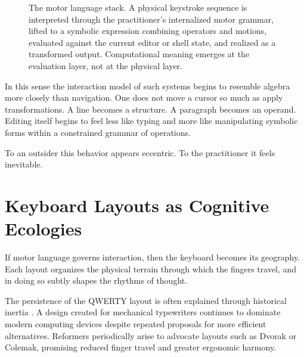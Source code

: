 \documentclass[12pt]{article}
\theoremstyle{definition}
\begin{document}
\begin{figure}[h]
\centering
{}
\caption{The motor language stack. A physical keystroke sequence is
interpreted through the practitioner's internalized motor grammar,
lifted to a symbolic expression combining operators and motions, evaluated
against the current editor or shell state, and realized as a transformed
output. Computational meaning emerges at the evaluation layer, not at
the physical layer.}
\label{fig:motor_stack}
\end{figure}

In this sense the interaction model of such systems begins to resemble
algebra more closely than navigation. One does not move a cursor so
much as apply transformations. A line becomes a structure. A paragraph
becomes an operand. Editing itself begins to feel less like typing and
more like manipulating symbolic forms within a constrained grammar of
operations.

To an outsider this behavior appears eccentric. To the practitioner it
feels inevitable.

\section{Keyboard Layouts as Cognitive Ecologies}

If motor language governs interaction, then the keyboard becomes its
geography. Each layout organizes the physical terrain through which the
fingers travel, and in doing so subtly shapes the rhythms of thought.

The persistence of the QWERTY layout is often explained through
historical inertia \cite{yamada1980}. A design created for mechanical
typewriters continues to dominate modern computing devices despite
repeated proposals for more efficient alternatives. Reformers
periodically arise to advocate layouts such as Dvorak or Colemak,
promising reduced finger travel and greater ergonomic harmony.
\end{document}
